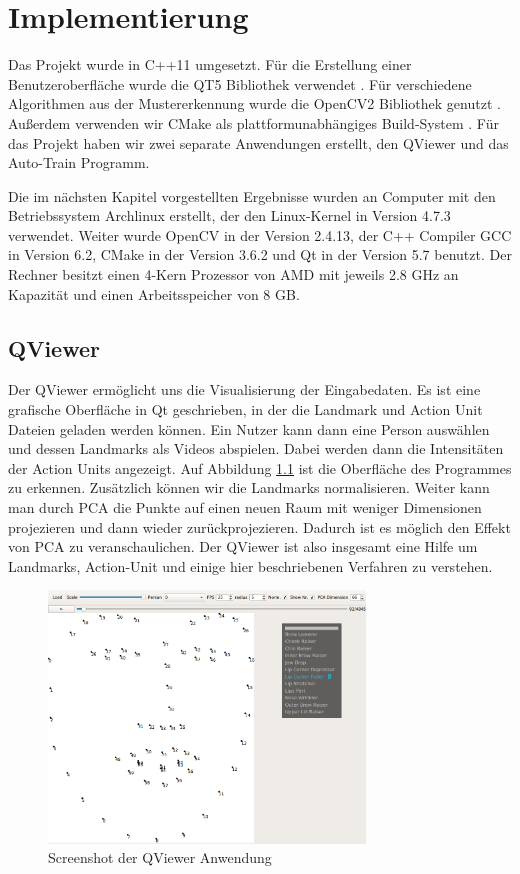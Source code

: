 \chapter{Implementierung}\label{ch:implementierung}
Das Projekt wurde in C++11 umgesetzt. Für die Erstellung einer Benutzeroberfläche wurde die QT5 Bibliothek verwendet \cite{qt5}.
Für verschiedene Algorithmen aus der Mustererkennung wurde die OpenCV2 Bibliothek genutzt \cite{opencv}. Außerdem verwenden wir CMake
als plattformunabhängiges Build-System \cite{cmake}. Für das Projekt haben wir zwei separate Anwendungen erstellt, den QViewer und das Auto-Train
Programm.

Die im nächsten Kapitel vorgestellten Ergebnisse wurden an Computer mit den Betriebssystem Archlinux erstellt, der den Linux-Kernel in Version 4.7.3 verwendet. Weiter wurde OpenCV in der Version 2.4.13, der C++ Compiler GCC in Version 6.2, CMake in der Version 3.6.2 und Qt in der Version 5.7 benutzt. Der Rechner besitzt einen 4-Kern Prozessor von AMD mit jeweils 2.8 GHz an Kapazität und einen Arbeitsspeicher von 8 GB. 
\section{QViewer}
Der QViewer ermöglicht uns die Visualisierung der Eingabedaten.
Es ist eine grafische Oberfläche in Qt geschrieben, in der
die Landmark und Action Unit Dateien geladen werden können. 
Ein Nutzer kann dann eine Person auswählen und dessen Landmarks als Videos abspielen.
Dabei werden dann die Intensitäten der Action Units angezeigt. Auf Abbildung \cref{Implementierung.QViewer} ist die Oberfläche des Programmes zu erkennen.
Zusätzlich können wir die Landmarks normalisieren. Weiter kann man durch PCA die Punkte auf einen neuen Raum mit weniger Dimensionen projezieren und dann wieder zurückprojezieren. Dadurch ist es möglich den Effekt von PCA zu veranschaulichen.
Der QViewer ist also insgesamt eine Hilfe um Landmarks, Action-Unit und einige hier beschriebenen Verfahren zu verstehen.

\begin{figure}
\begin{center}
\includegraphics[width=0.75\textwidth]{qviewer.png}
\caption{Screenshot der QViewer Anwendung}
\end{center}
\label{Implementierung.QViewer}
\end{figure}


